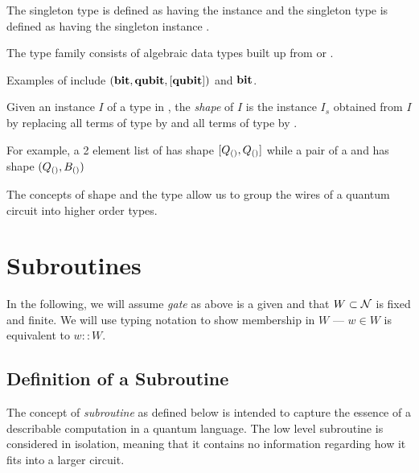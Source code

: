 
\begin{definition}\label{def:singletons}
  The singleton type  is defined as having the instance \Bs and the
  singleton type  is defined as having the singleton instance \Qs.
\end{definition}

\begin{definition}\label{def:qcdata}
  The type family  consists of algebraic data types
  built up from \bit or \qubit.
\end{definition}

Examples of  include $(\mathbf{{bit}},\mathbf{{qubit}},[\mathbf{{qubit}}])$ and $\mathbf{{bit}}$.

\begin{definition}\label{def:shape}
  Given an instance $I$ of a type  in ,
  the \emph{shape} of $I$ is the instance $I_s$ obtained from
  $I$ by replacing all terms of type \bit by  \Bs and all terms
  of type \qubit by \Qs.
\end{definition}

For example, a 2 element list of \qubits has shape $[Q_{()},Q_{()}]$
while a pair of a \qubit and \bit has shape $(Q_{()},B_{()})$


The concepts of shape and the type  allow us to group
the wires of a quantum circuit into higher
order types.

\section{Subroutines} %
\label{sec:subroutines}
In the following, we will assume \emph{gate} as above is a given
and that $W\subset\mathcal{N}$ is fixed and  finite. We
will use typing notation to show membership in $W$ --- $w\in W$
is equivalent to $w::W$.


\subsection{Definition of a Subroutine} %
\label{sub:definition_of_a_subroutine}
The concept of \emph{subroutine} as defined below is intended
to capture the essence of a describable computation
in a quantum language. The low level subroutine is considered in
isolation, meaning that it contains no information regarding
how it fits into a larger circuit.

